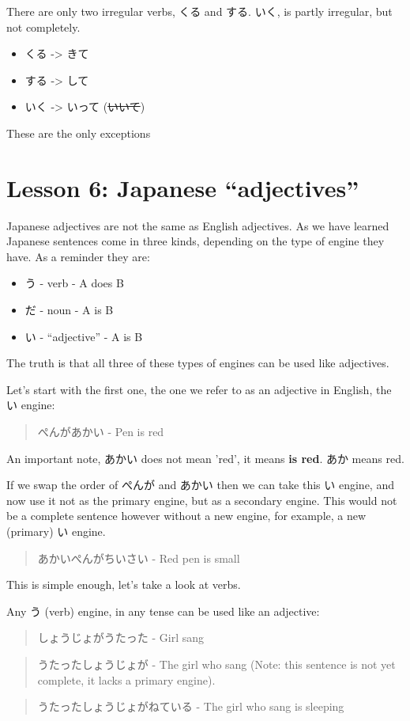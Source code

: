 \documentclass[11pt]{article}
\begin{document}
There are only two irregular verbs, くる and する. いく, is partly irregular, but not completely.
\begin{itemize}
\item くる -> きて
\item する -> して
\item いく -> いって (\sout{いいて})
\end{itemize}
These are the only exceptions
\section{Lesson 6: Japanese ``adjectives''}
\label{sec:orgb6b9d26}
Japanese adjectives are not the same as English adjectives. As we have learned Japanese sentences come in three kinds, depending on the type of engine they have. As a reminder they are:
\begin{itemize}
\item う - verb - A does B
\item だ - noun - A is B
\item い - ``adjective'' - A is B
\end{itemize}

The truth is that all three of these types of engines can be used like adjectives.

Let's start with the first one, the one we refer to as an adjective in English, the い engine:
\begin{quote}
ぺんがあかい - Pen is red
\end{quote}
An important note, あかい does not mean 'red', it means \textbf{is red}. あか means red.

If we swap the order of ぺんが and あかい then we can take this い engine, and now use it not as the primary engine, but as a secondary engine. This would not be a complete sentence however without a new engine, for example, a new (primary) い engine.
\begin{quote}
あかいぺんがちいさい - Red pen is small
\end{quote}
This is simple enough, let's take a look at verbs.

Any う (verb) engine, in any tense can be used like an adjective:
\begin{quote}
しょうじょがうたった - Girl sang
\end{quote}
\begin{quote}
うたったしょうじょが - The girl who sang (Note: this sentence is not yet complete, it lacks a primary engine).
\end{quote}
\begin{quote}
うたったしょうじょがねている - The girl who sang is sleeping
\end{quote}
\end{document}
